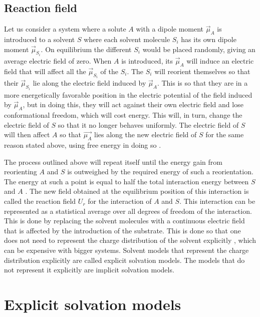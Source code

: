 \documentclass[../Thesis.tex]{subfiles}
\begin{document}
\subsection{Reaction field}\label{Reaction_field}
Let us consider a system where a solute $A$ with a dipole moment $\vec{\mu}_A$ is
introduced to a solvent $S$ where each solvent molecule $S_i$ has its own dipole
moment $\vec{\mu}_{S_i}$. On equilibrium the different $S_i$  would be placed
randomly, giving an average electric field of zero. When $A$ is introduced, its
$\vec{\mu}_A$ will induce an electric field that will affect all the
$\vec{\mu}_{S_i}$ of the $S_i$. The $S_i$ will reorient themselves so that their
$\vec{\mu}_{S_i}$ lie along the electric field induced by $\vec{\mu}_A$. This is
so that they are in a more energetically favorable position in the electric
potential of the field induced by $\vec{\mu}_A$, but in doing this, they will
act against their own electric field and lose conformational freedom, which will
cost energy. This will, in turn, change the electric field of $S$ so that it no
longer behaves uniformly. The electric field of $S$ will then affect $A$ so that
$\vec{\mu_A}$ lies along the new electric field of $S$ for the same reason
stated above, using free energy in doing so \cite{Cramer:2004}.

The process outlined above will repeat itself until the energy gain from
reorienting $A$ and $S$ is outweighed by the required energy of such a
reorientation. The energy at such a point is equal to half the total interaction
energy between $S$ and $A$ \cite{Cramer:2004}. The new field obtained at the
equilibrium position of this interaction is called the reaction field $U_r$ for
the interaction of $A$ and $S$.
This interaction can be represented as a statistical average over all degrees of freedom of
the interaction. This is done by replacing the solvent molecules with a continuous electric
field that is affected by the introduction of the substrate. This is done so
that one does not need to represent the charge distribution of the solvent explicitly \cite{Cramer:2004},
which can be expensive with bigger systems.
Solvent models that represent the charge distribution explicitly are called
explicit solvation models. The models that do not represent it explicitly are
implicit solvation models.

\section{Explicit solvation models}
\end{document}
